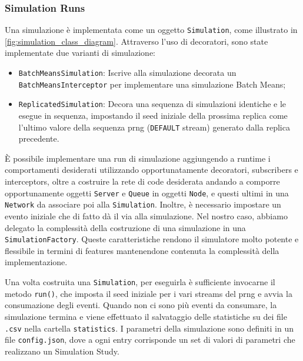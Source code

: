 \subsubsection{Simulation Runs}
Una simulazione è implementata come un oggetto \texttt{Simulation}, come illustrato in \autoref{fig:simulation_class_diagram}. Attraverso l'uso di decoratori, sono state implementate due varianti di simulazione:
\begin{itemize}
    \item \texttt{BatchMeansSimulation}: Iscrive alla simulazione decorata un \texttt{BatchMeansInterceptor} per implementare una simulazione Batch Means;
    \item \texttt{ReplicatedSimulation}: Decora una sequenza di simulazioni identiche e le esegue in sequenza, impostando il seed iniziale della prossima replica come l'ultimo valore della sequenza prng (\texttt{DEFAULT} stream) generato dalla replica precedente.
\end{itemize}
È possibile implementare una run di simulazione aggiungendo a runtime i comportamenti desiderati utilizzando opportunatamente decoratori, subscribers e interceptors, oltre a costruire la rete di code desiderata andando a comporre opportunamente oggetti \texttt{Server} e \texttt{Queue} in oggetti \texttt{Node}, e questi ultimi in una \texttt{Network} da associare poi alla \texttt{Simulation}. Inoltre, è necessario impostare un evento iniziale che di fatto dà il via alla simulazione. Nel nostro caso, abbiamo delegato la complessità della costruzione di una simulazione in una \texttt{SimulationFactory}. Queste caratteristiche rendono il simulatore molto potente e flessibile in termini di features mantenendone contenuta la complessità della implementazione.   

Una volta costruita una \texttt{Simulation}, per eseguirla è sufficiente invocarne il metodo \texttt{run()}, che imposta il seed iniziale per i vari streams del prng e avvia la consumazione degli eventi. Quando non ci sono più eventi da consumare, la simulazione termina e viene effettuato il salvataggio delle statistiche su dei file \texttt{.csv} nella cartella \texttt{statistics}. I parametri della simulazione sono definiti in un file \texttt{config.json}, dove a ogni entry corrisponde un set di valori di parametri che realizzano un Simulation Study.
